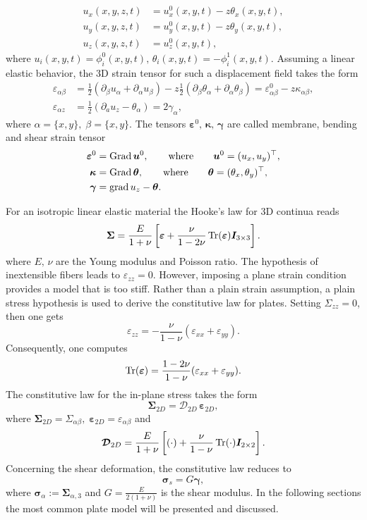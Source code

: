 \begin{equation}\label{eq:disp1or}
\begin{aligned}
u_x(x,y,z,t) &= u_x^0(x,y,t) -z \theta_x(x,y,t), \\
u_y(x,y,z,t) &= u_y^0(x,y,t) -z \theta_y(x,y,t), \\
u_z(x,y,z,t) &= u_z^0(x,y,t), 
\end{aligned}
\end{equation}
where $u_i(x,y,t) = \phi_i^0(x,y,t), \, \theta_i(x,y,t) = -\phi_i^1(x,y,t)$. Assuming a linear elastic behavior, the 3D strain tensor for such a displacement field takes the form
\begin{align*}
\varepsilon_{\alpha \beta} &= \frac{1}{2} \left(\partial_\beta u_\alpha + \partial_\alpha u_\beta \right) - z \frac{1}{2} \left(\partial_\beta \theta_\alpha + \partial_\alpha \theta_\beta \right) = {\varepsilon}^0_{\alpha \beta} - z \kappa_{\alpha \beta}, \\
\varepsilon_{\alpha z} &= \frac{1}{2} \left(\partial_a u_z - \theta_\alpha \right) = 2 \gamma_\alpha,
\end{align*}
where $\alpha=\{x,y\}, \; \beta=\{x,y\}$. The tensors $\bm{\varepsilon}^0,\, \bm{\kappa},\, \bm{\gamma}$ are called membrane, bending and shear strain tensor
\begin{align}
\bm{\varepsilon}^0 &= \operatorname*{Grad} \bm{u}^0, \qquad \text{where} \qquad \bm{u}^0 = (u_x, u_y)^\top,  \\
\bm{\kappa} &= \operatorname*{Grad} \bm{\theta}, \qquad \text{where} \qquad \bm{\theta} = (\theta_x, \theta_y)^\top, \label{eq:kappa}  \\
\bm{\gamma} &= \operatorname*{grad} u_z - \bm{\theta}. \label{eq:gamma}
\end{align}

For an isotropic linear elastic material the Hooke's law for 3D continua reads
\[
\bm{\Sigma} = \frac{E}{1+\nu} \left[\bm{\varepsilon} + \frac{\nu}{1-2\nu} \operatorname{Tr}(\bm{\varepsilon})\bm{I}_{3\times 3} \right].
\]
where $E,\, \nu$ are the Young modulus and Poisson ratio. The hypothesis of inextensible fibers leads to $\varepsilon_{zz}=0$. However, imposing a plane strain condition provides a model that is too stiff. Rather than a plain strain assumption, a plain stress hypothesis is used to derive the constitutive law for plates. Setting $\Sigma_{zz}=0$, then one gets
\[
\varepsilon_{zz} = - \frac{\nu}{1 - \nu} (\varepsilon_{xx} + \varepsilon_{yy}).
\]
Consequently, one computes
\[\operatorname{Tr}(\bm{\varepsilon}) = \frac{1 - 2\nu}{1 - \nu} (\varepsilon_{xx} + \varepsilon_{yy}).
\]
The constitutive law for the in-plane stress takes the form
\[
\bm{\Sigma}_{2D} = \bm{\mathcal{D}}_{2D} \, \bm{\varepsilon}_{2D},
\]
where $\bm{\Sigma}_{2D} = \Sigma_{\alpha\beta}, \; \bm{\varepsilon}_{2D} = \varepsilon_{\alpha\beta}$ and 
\[
\bm{\mathcal{D}}_{2D} = \frac{E}{1+\nu}\left[ (\cdot) + \frac{\nu}{1-\nu} \operatorname{Tr}(\cdot) \bm{I}_{2\times 2} \right].
\]
Concerning the shear deformation, the constitutive law reduces to 
\begin{equation}
\bm{\sigma}_s = G \bm{\gamma},
\end{equation}
where $\bm{\sigma}_\alpha := \bm{\Sigma}_{\alpha, 3}$ and $G = \frac{E}{2(1 + \nu)}$ is the shear modulus. In the following sections the most common plate model will be presented and discussed.


